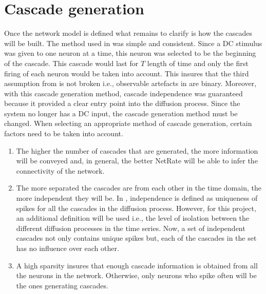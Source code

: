 


\section{Cascade generation}\label{sec:simulating_cascade_generation}

Once the network model is defined what remains to clarify is how the cascades will be built. The method used in \cite{alexandru2018estimating} was simple and consistent. Since a DC stimulus was given to one neuron at a time, this neuron was selected to be the beginning of the cascade. This cascade would last for \(T\) length of time and only the first firing of each neuron would be taken into account. This insures that the third assumption from \cite{rodriguez2011uncovering} is not broken i.e., observable artefacts in are binary. Moreover, with this cascade generation method, cascade independence was guaranteed because it provided a clear entry point into the diffusion process. Since the system no longer has a DC input, the cascade generation method must be changed. When selecting an appropriate method of cascade generation, certain factors need to be taken into account.
\begin{enumerate}
\item The higher the number of cascades that are generated, the more information will be conveyed and, in general, the better NetRate will be able to infer the connectivity of the network. 
\item The more separated the cascades are from each other in the time domain, the more independent they will be. In \cite{rodriguez2011uncovering}, independence is defined as uniqueness of spikes for all the cascades in the diffusion process. However, for this project, an additional definition will be used i.e., the level of isolation between the different diffusion processes in the time series. Now, a set of independent cascades not only contains unique spikes but, each of the cascades in the set has no influence over each other.
\item A high sparsity insures that enough cascade information is obtained from all the neurons in the network. Otherwise, only neurons who spike often will be the ones generating cascades.
\end{enumerate}

